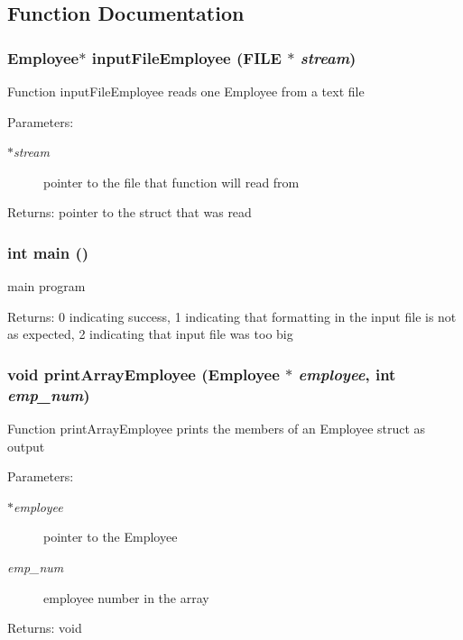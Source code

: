 \subsection{Function Documentation}
\subsubsection{\setlength{\rightskip}{0pt plus 5cm}\bf{Employee}$\ast$ input\-File\-Employee (FILE $\ast$ {\em stream})}\label{myfiles_8c_348b02b9eb67cc6acdc054453e9a6fa4}


Function input\-File\-Employee reads one Employee from a text file \begin{Desc}
\item[Parameters:]
\begin{description}
\item[{\em $\ast$stream}]pointer to the file that function will read from \end{description}
\end{Desc}
\begin{Desc}
\item[Returns:]pointer to the struct that was read \end{Desc}
\subsubsection{\setlength{\rightskip}{0pt plus 5cm}int main ()}\label{myfiles_8c_446c6b9a1a4dbab517fbb760870458a3}


main program \begin{Desc}
\item[Returns:]0 indicating success, 1 indicating that formatting in the input file is not as expected, 2 indicating that input file was too big \end{Desc}
\subsubsection{\setlength{\rightskip}{0pt plus 5cm}void print\-Array\-Employee (\bf{Employee} $\ast$ {\em employee}, int {\em emp\_\-num})}\label{myfiles_8c_3ac37e8b3774f7487054087208c16331}


Function print\-Array\-Employee prints the members of an Employee struct as output \begin{Desc}
\item[Parameters:]
\begin{description}
\item[{\em $\ast$employee}]pointer to the Employee \item[{\em emp\_\-num}]employee number in the array \end{description}
\end{Desc}
\begin{Desc}
\item[Returns:]void \end{Desc}
